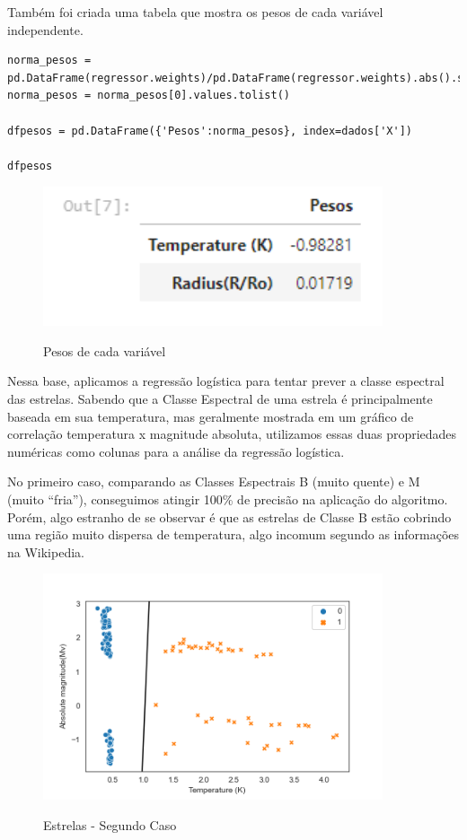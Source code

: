 \documentclass[12pt]{article}
\begin{document}
\vspace{120pt}
Também foi criada uma tabela que mostra os pesos de cada variável independente.\\

\begin{lstlisting}
norma_pesos = pd.DataFrame(regressor.weights)/pd.DataFrame(regressor.weights).abs().sum()
norma_pesos = norma_pesos[0].values.tolist()

dfpesos = pd.DataFrame({'Pesos':norma_pesos}, index=dados['X'])

dfpesos
\end{lstlisting}

\begin{figure}[h]
\caption{Pesos de cada variável}
\centering
\includegraphics[width=10cm]{out2.png}
\label{figura:out2}
\end{figure}

Nessa base, aplicamos a regressão logística para tentar prever a classe espectral das estrelas. Sabendo que a Classe Espectral de uma estrela é principalmente baseada em sua temperatura, mas geralmente mostrada em um gráfico de correlação temperatura x magnitude absoluta, utilizamos essas duas propriedades numéricas como colunas para a análise da regressão logística.

\hspace{0.4cm} No primeiro caso, comparando as Classes Espectrais B (muito quente) e M (muito “fria”), conseguimos atingir 100\% de precisão na aplicação do algoritmo. Porém, algo estranho de se observar é que as estrelas de Classe B estão cobrindo uma região muito dispersa de temperatura, algo incomum segundo as informações na Wikipedia.\\

\begin{figure}[h]
\caption{Estrelas - Segundo Caso}
\centering
\includegraphics[width=10cm]{estrelas.png}
\label{figura:estrelas}
\end{figure}
\end{document}
